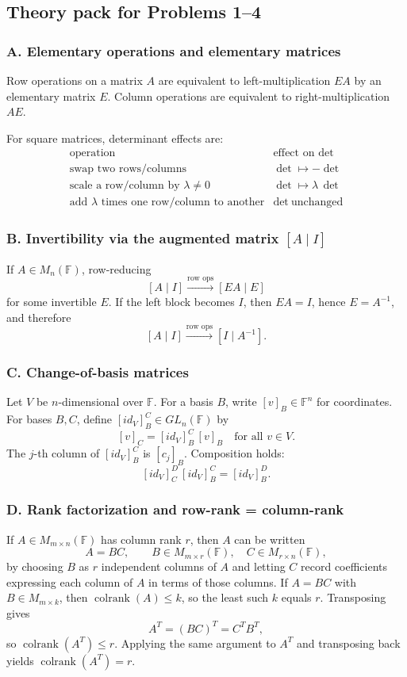\documentclass[12pt,a4paper]{article}
\theoremstyle{plain}
\theoremstyle{definition}      %
\begin{document}
\subsection*{Theory pack for Problems 1--4}

\subsubsection*{A. Elementary operations and elementary matrices}
Row operations on a matrix \(A\) are equivalent to left-multiplication \(EA\) by an elementary matrix \(E\).
Column operations are equivalent to right-multiplication \(AE\).

For square matrices, determinant effects are:
\[
\begin{array}{c|c}
	\text{operation} & \text{effect on }\det \\ \hline
	\text{swap two rows/columns} & \det \mapsto -\det\\
	\text{scale a row/column by }\lambda\neq0 & \det \mapsto \lambda\,\det\\
	\text{add }\lambda\text{ times one row/column to another} & \det\ \text{unchanged}
\end{array}
\]

\subsubsection*{B. Invertibility via the augmented matrix \([A\mid I]\)}
If \(A\in M_n(\mathbb F)\), row-reducing
\[
[A\mid I] \xrightarrow{\text{row ops}} [EA\mid E]
\]
for some invertible \(E\).
If the left block becomes \(I\), then \(EA=I\), hence \(E=A^{-1}\), and therefore
\[
[A\mid I] \xrightarrow{\text{row ops}} [I\mid A^{-1}].
\]

\subsubsection*{C. Change-of-basis matrices}
Let \(V\) be \(n\)-dimensional over \(\mathbb F\). For a basis \(B\), write \([v]_B\in\mathbb F^n\) for coordinates.
For bases \(B,C\), define \([id_V]^C_B\in GL_n(\mathbb F)\) by
\[
[v]_C = [id_V]^C_B\,[v]_B \quad \text{for all }v\in V.
\]
The \(j\)-th column of \([id_V]^C_B\) is \([c_j]_B\).
Composition holds:
\[
[id_V]^D_C\,[id_V]^C_B = [id_V]^D_B.
\]

\subsubsection*{D. Rank factorization and row-rank = column-rank}
If \(A\in M_{m\times n}(\mathbb F)\) has column rank \(r\), then \(A\) can be written
\[
A=BC,\qquad B\in M_{m\times r}(\mathbb F),\quad C\in M_{r\times n}(\mathbb F),
\]
by choosing \(B\) as \(r\) independent columns of \(A\) and letting \(C\) record coefficients expressing each column of \(A\)
in terms of those columns.
If \(A=BC\) with \(B\in M_{m\times k}\), then \(\operatorname{colrank}(A)\le k\), so the least such \(k\) equals \(r\).
Transposing gives
\[
A^T=(BC)^T=C^T B^T,
\]
so \(\operatorname{colrank}(A^T)\le r\). Applying the same argument to \(A^T\) and transposing back yields
\(\operatorname{colrank}(A^T)=r\).
\end{document}

